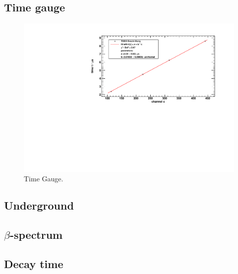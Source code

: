 \subsection{Time gauge}
\begin{figure}[H]
\begin{center}
  \includegraphics[width=\textwidth]{../img/timeGauge.pdf}
  \caption{Time Gauge.}
  \label{img:timegauge}
\end{center}
\end{figure}

\subsection{Underground}

\subsection{$\beta$-spectrum}

\subsection{Decay time}